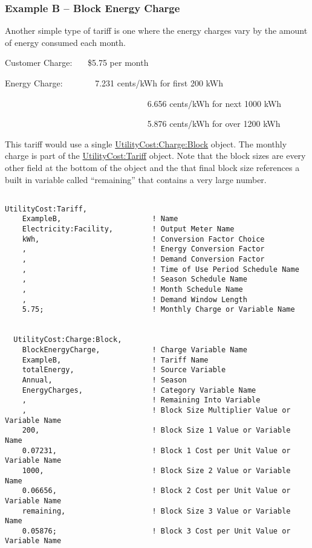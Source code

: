 \subsubsection{Example B -- Block Energy Charge}\label{example-b-block-energy-charge}

Another simple type of tariff is one where the energy charges vary by the amount of energy consumed each month.

Customer Charge:~~~ \$5.75 per month

Energy Charge:~~~~~~~ 7.231 cents/kWh for first 200 kWh

~~~~~~~~~~~~~~~~~~~~~~~~~~~~~~~~~ 6.656 cents/kWh for next 1000 kWh

~~~~~~~~~~~~~~~~~~~~~~~~~~~~~~~~~ 5.876 cents/kWh for over 1200 kWh

This tariff would use a single \hyperref[utilitycostchargeblock]{UtilityCost:Charge:Block} object. The monthly charge is part of the \hyperref[utilitycosttariff]{UtilityCost:Tariff} object. Note that the block sizes are every other field at the bottom of the object and the that final block size references a built in variable called ``remaining'' that contains a very large number.

\begin{lstlisting}

UtilityCost:Tariff,
    ExampleB,                     ! Name
    Electricity:Facility,         ! Output Meter Name
    kWh,                          ! Conversion Factor Choice
    ,                             ! Energy Conversion Factor
    ,                             ! Demand Conversion Factor
    ,                             ! Time of Use Period Schedule Name
    ,                             ! Season Schedule Name
    ,                             ! Month Schedule Name
    ,                             ! Demand Window Length
    5.75;                         ! Monthly Charge or Variable Name


  UtilityCost:Charge:Block,
    BlockEnergyCharge,            ! Charge Variable Name
    ExampleB,                     ! Tariff Name
    totalEnergy,                  ! Source Variable
    Annual,                       ! Season
    EnergyCharges,                ! Category Variable Name
    ,                             ! Remaining Into Variable
    ,                             ! Block Size Multiplier Value or Variable Name
    200,                          ! Block Size 1 Value or Variable Name
    0.07231,                      ! Block 1 Cost per Unit Value or Variable Name
    1000,                         ! Block Size 2 Value or Variable Name
    0.06656,                      ! Block 2 Cost per Unit Value or Variable Name
    remaining,                    ! Block Size 3 Value or Variable Name
    0.05876;                      ! Block 3 Cost per Unit Value or Variable Name
\end{lstlisting}

